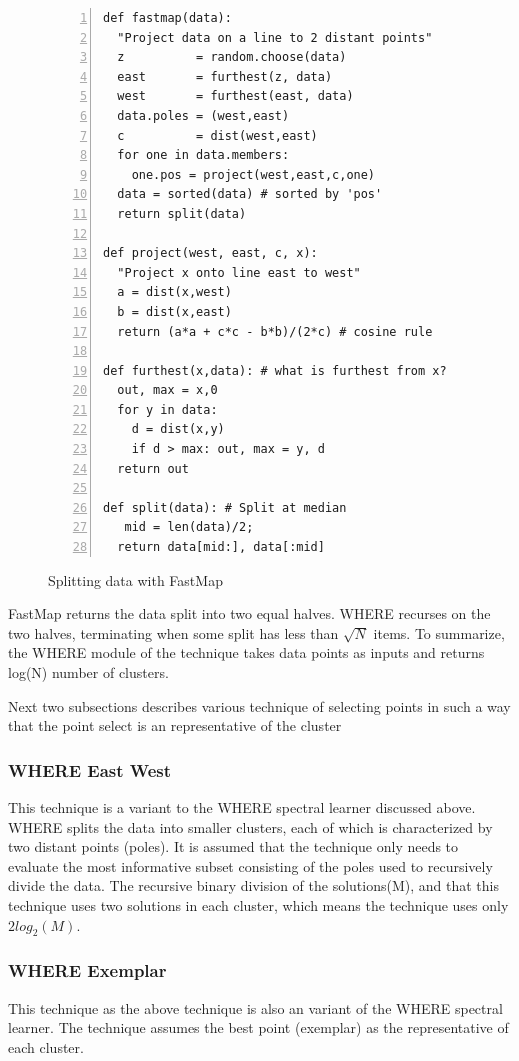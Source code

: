 \documentclass{sig-alternative}
\begin{document}
\begin{figure}[!t] 
\begin{minipage}{3.2in}
\begin{lstlisting}[mathescape,frame=l,numbers=left]
def fastmap(data): 
  "Project data on a line to 2 distant points"
  z          = random.choose(data)
  east       = furthest(z, data)
  west       = furthest(east, data)
  data.poles = (west,east)
  c          = dist(west,east)     
  for one in data.members: 
    one.pos = project(west,east,c,one)
  data = sorted(data) # sorted by 'pos'
  return split(data)

def project(west, east, c, x): 
  "Project x onto line east to west"
  a = dist(x,west)
  b = dist(x,east)
  return (a*a + c*c - b*b)/(2*c) # cosine rule

def furthest(x,data): # what is furthest from x?
  out, max = x,0
  for y in data:
    d = dist(x,y)
    if d > max: out, max = y, d
  return out

def split(data): # Split at median
   mid = len(data)/2; 
  return data[mid:], data[:mid]
\end{lstlisting}
\caption{Splitting data with FastMap}
\label{fig:fastmapCode}  
\end{minipage}
\end{figure}

FastMap returns the data split into two equal halves.
WHERE recurses on the two halves, terminating when some split has less than $\sqrt{N}$ items. To summarize, the WHERE module of the technique takes data points as inputs and returns log(N) number of clusters.

Next two subsections describes various technique of selecting points in such a way that the point select is an representative of the cluster
\subsubsection{WHERE East West}\label{where_east_west}
This technique is a variant to the WHERE spectral learner discussed above. WHERE splits the data into smaller clusters, each of which is characterized by two distant points (poles). 
It is assumed  that the technique only needs to evaluate
the most informative subset consisting of the poles used to
recursively divide the data. The recursive binary division of the solutions(M), and that this technique uses two solutions in each cluster, which means the technique uses only $2log_2(M)$.

\subsubsection{WHERE Exemplar}\label{where_exemplar}
This technique as the above technique is also an variant of the WHERE spectral learner. The technique assumes the best point (exemplar) as the representative of each cluster. 
\end{document}

